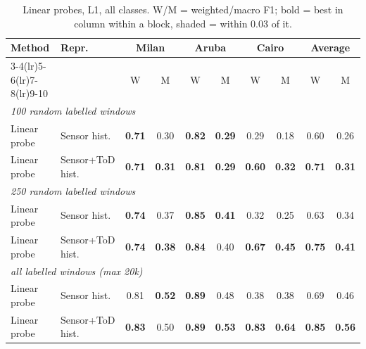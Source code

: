 \begin{table}[H]
\centering\small
\caption{Linear probes, L1, all classes. W/M = weighted/macro F1; bold = best in column within a block, shaded = within 0.03 of it.}
\label{tab:probe_l1_all}
\setlength{\tabcolsep}{3.5pt}
\begin{tabular}{llcc|cc|cc|cc}
\toprule
Method & Repr. & \multicolumn{2}{c}{Milan} & \multicolumn{2}{c}{Aruba} & \multicolumn{2}{c}{Cairo} & \multicolumn{2}{c}{Average} \\
\cmidrule(lr){3-4}\cmidrule(lr){5-6}\cmidrule(lr){7-8}\cmidrule(lr){9-10}
 & & W & M & W & M & W & M & W & M \\
\midrule
\multicolumn{10}{l}{\textit{100 random labelled windows}} \\
\midrule
Linear probe & Sensor hist. & \cellcolor{blue!12}\textbf{0.71} & \cellcolor{blue!12}0.30 & \cellcolor{blue!12}\textbf{0.82} & \cellcolor{blue!12}\textbf{0.29} & 0.29 & 0.18 & 0.60 & 0.26 \\
Linear probe & Sensor+ToD hist. & \cellcolor{blue!12}\textbf{0.71} & \cellcolor{blue!12}\textbf{0.31} & \cellcolor{blue!12}\textbf{0.81} & \cellcolor{blue!12}\textbf{0.29} & \cellcolor{blue!12}\textbf{0.60} & \cellcolor{blue!12}\textbf{0.32} & \cellcolor{blue!12}\textbf{0.71} & \cellcolor{blue!12}\textbf{0.31} \\
\midrule
\multicolumn{10}{l}{\textit{250 random labelled windows}} \\
\midrule
Linear probe & Sensor hist. & \cellcolor{blue!12}\textbf{0.74} & \cellcolor{blue!12}0.37 & \cellcolor{blue!12}\textbf{0.85} & \cellcolor{blue!12}\textbf{0.41} & 0.32 & 0.25 & 0.63 & 0.34 \\
Linear probe & Sensor+ToD hist. & \cellcolor{blue!12}\textbf{0.74} & \cellcolor{blue!12}\textbf{0.38} & \cellcolor{blue!12}\textbf{0.84} & \cellcolor{blue!12}0.40 & \cellcolor{blue!12}\textbf{0.67} & \cellcolor{blue!12}\textbf{0.45} & \cellcolor{blue!12}\textbf{0.75} & \cellcolor{blue!12}\textbf{0.41} \\
\midrule
\multicolumn{10}{l}{\textit{all labelled windows (max 20k)}} \\
\midrule
Linear probe & Sensor hist. & \cellcolor{blue!12}0.81 & \cellcolor{blue!12}\textbf{0.52} & \cellcolor{blue!12}\textbf{0.89} & 0.48 & 0.38 & 0.38 & 0.69 & 0.46 \\
Linear probe & Sensor+ToD hist. & \cellcolor{blue!12}\textbf{0.83} & \cellcolor{blue!12}0.50 & \cellcolor{blue!12}\textbf{0.89} & \cellcolor{blue!12}\textbf{0.53} & \cellcolor{blue!12}\textbf{0.83} & \cellcolor{blue!12}\textbf{0.64} & \cellcolor{blue!12}\textbf{0.85} & \cellcolor{blue!12}\textbf{0.56} \\
\bottomrule
\end{tabular}
\end{table}

